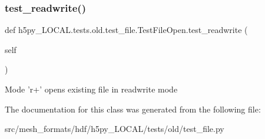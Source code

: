 \subsubsection{\texorpdfstring{test\+\_\+readwrite()}{test\_readwrite()}}
{\footnotesize\ttfamily def h5py\+\_\+\+L\+O\+C\+A\+L.\+tests.\+old.\+test\+\_\+file.\+Test\+File\+Open.\+test\+\_\+readwrite (\begin{DoxyParamCaption}\item[{}]{self }\end{DoxyParamCaption})}

\begin{DoxyVerb}Mode 'r+' opens existing file in readwrite mode \end{DoxyVerb}
 

The documentation for this class was generated from the following file\+:\begin{DoxyCompactItemize}
\item 
src/mesh\+\_\+formats/hdf/h5py\+\_\+\+L\+O\+C\+A\+L/tests/old/test\+\_\+file.\+py\end{DoxyCompactItemize}
